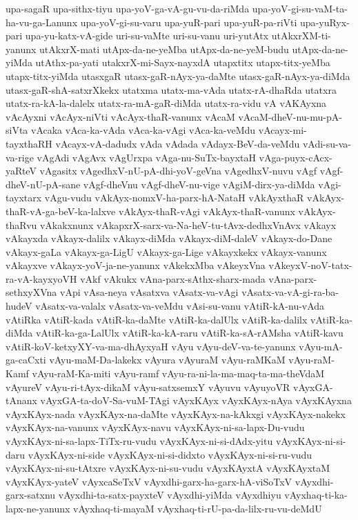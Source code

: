 {upa-sagaR
upa-sithx-tiyu
upa-yoV-ga-vA-gu-vu-da-riMda
upa-yoV-gi-su-vaM-ta-ha-vu-ga-Lanunx
upa-yoV-gi-su-varu
upa-yuR-pari
upa-yuR-pa-riVti
upa-yuRyx-pari
upa-yu-katx-vA-gide
uri-su-vaMte
uri-su-vanu
uri-yutAtx
utAkxrXM-ti-yanunx
utAkxrX-mati
utApx-da-ne-yeMba
utApx-da-ne-yeM-budu
utApx-da-ne-yiMda
utAthx-pa-yati
utakxrX-mi-Sayx-nayxdA
utapxtitx
utapx-titx-yeMba
utapx-titx-yiMda
utasxgaR
utasx-gaR-nAyx-ya-daMte
utasx-gaR-nAyx-ya-diMda
utasx-gaR-shA-satxrXkekx
utatxma
utatx-ma-vAda
utatx-rA-dhaRda
utatxra
utatx-ra-kA-la-dalelx
utatx-ra-mA-gaR-diMda
utatx-ra-vidu
vA
vAKAyxna
vAcAyxni
vAcAyx-niVti
vAcAyx-thaR-vanunx
vAcaM
vAcaM-dheV-nu-mu-pA-siVta
vAcaka
vAca-ka-vAda
vAca-ka-vAgi
vAca-ka-veMdu
vAcayx-mi-tayxthaRH
vAcayx-vA-dadudx
vAda
vAdada
vAdayx-BeV-da-veMdu
vAdi-su-va-va-rige
vAgAdi
vAgAvx
vAgUrxpa
vAga-nu-SuTx-bayxtaH
vAga-puyx-cAcx-yaRteV
vAgasitx
vAgedhxV-nU-pA-dhi-yoV-geVna
vAgedhxV-nuvu
vAgf
vAgf-dheV-nU-pA-sane
vAgf-dheVnu
vAgf-dheV-nu-vige
vAgiM-dirx-ya-diMda
vAgi-tayxtarx
vAgu-vudu
vAkAyx-nomxV-ha-parx-hA-NataH
vAkAyxthaR
vAkAyx-thaR-vA-ga-beV-ka-lalxve
vAkAyx-thaR-vAgi
vAkAyx-thaR-vanunx
vAkAyx-thaRvu
vAkakxnunx
vAkapxrX-sarx-va-Na-heV-tu-tAvx-dedhxVnAvx
vAkayx
vAkayxda
vAkayx-dalilx
vAkayx-diMda
vAkayx-diM-daleV
vAkayx-do-Dane
vAkayx-gaLa
vAkayx-ga-LigU
vAkayx-ga-Lige
vAkayxkekx
vAkayx-vanunx
vAkayxve
vAkayx-yoV-ja-ne-yanunx
vAkekxMba
vAkeyxVna
vAkeyxV-noV-tatx-ra-vA-kayxyoVH
vAkf
vAkukx
vAna-parx-sAthx-sharx-mada
vAna-parx-sethxyXVna
vApi
vAsa-neya
vAsatxva
vAsatx-va-vAgi
vAsatx-va-vA-gi-ra-ba-hudeV
vAsatx-va-valalx
vAsatx-va-veMdu
vAsi-su-vanu
vAtiR-kA-nu-vAda
vAtiRka
vAtiR-kada
vAtiR-ka-daMte
vAtiR-ka-dalUlx
vAtiR-ka-dalilx
vAtiR-ka-diMda
vAtiR-ka-ga-LalUlx
vAtiR-ka-kA-raru
vAtiR-ka-sA-rAMsha
vAtiR-kavu
vAtiR-koV-ketxyXY-va-ma-dhAyxyaH
vAyu
vAyu-deV-va-te-yanunx
vAyu-mA-ga-caCxti
vAyu-maM-Da-lakekx
vAyura
vAyuraM
vAyu-raMKaM
vAyu-raM-Kamf
vAyu-raM-Ka-miti
vAyu-ramf
vAyu-ra-ni-la-ma-maq-ta-ma-theVdaM
vAyureV
vAyu-ri-tAyx-dikaM
vAyu-satxsemxY
vAyuvu
vAyuyoVR
vAyxGA-tAnanx
vAyxGA-ta-doV-Sa-vuM-TAgi
vAyxKAyx
vAyxKAyx-nAya
vAyxKAyxna
vAyxKAyx-nada
vAyxKAyx-na-daMte
vAyxKAyx-na-kAkxgi
vAyxKAyx-nakekx
vAyxKAyx-na-vanunx
vAyxKAyx-navu
vAyxKAyx-ni-sa-lapx-Du-vudu
vAyxKAyx-ni-sa-lapx-TiTx-ru-vudu
vAyxKAyx-ni-si-dAdx-yitu
vAyxKAyx-ni-si-daru
vAyxKAyx-ni-side
vAyxKAyx-ni-si-didxto
vAyxKAyx-ni-si-ru-vudu
vAyxKAyx-ni-su-tAtxre
vAyxKAyx-ni-su-vudu
vAyxKAyxtA
vAyxKAyxtaM
vAyxKAyx-yateV
vAyxcaSeTxV
vAyxdhi-garx-ha-garx-hA-viSoTxV
vAyxdhi-garx-satxnu
vAyxdhi-ta-satx-payxteV
vAyxdhi-yiMda
vAyxdhiyu
vAyxhaq-ti-ka-lapx-ne-yanunx
vAyxhaq-ti-mayaM
vAyxhaq-ti-rU-pa-da-lilx-ru-vu-deMdU
}
